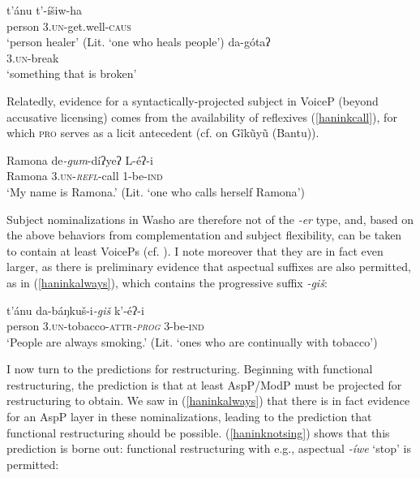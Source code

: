 \documentclass[output=paper]{langscibook}
\begin{document}
\ea \gll t'ánu t'-íšiw-ha\\
person 3.\textsc{un}-get.well-{\scshape caus}\\
\glt `person healer' (Lit. `one who heals people') \label{haninkhealer}
\ex \gll da-gótaʔ\\
\textsc{3.{\scshape un}}-{break}\\
\glt `something that is broken' \label{haninkbroken}
\z 

\noindent Relatedly, evidence for a syntactically-projected subject in VoiceP (beyond accusative licensing) comes from the availability of reflexives (\ref{haninkcall}), for which {\scshape pro} serves as a licit antecedent (cf. \citealt{bakervinokurova2009} on Gĩkũyũ (Bantu)). 

\ea \gll Ramona de{\itshape -gum}-díʔyeʔ L-éʔ-i\\
Ramona {\scshape 3.{\scshape un}}-\textit{\textsc{refl}}-call 1-be-{\scshape ind}\\
\glt `My name is Ramona.' (Lit. `{one who calls herself Ramona}') \label{haninkcall}
\z

Subject nominalizations in Washo are therefore not of the {\itshape -er} type, and, based on the above behaviors from complementation and subject flexibility, can be taken to contain at least VoicePs (cf.  \citealt{bochnaketal2011}). I note moreover that they are in fact even larger, as there is preliminary evidence that aspectual suffixes are also permitted, as in (\ref{haninkalways}), which contains the progressive suffix {\itshape -giš}:%

 \ea \gll t'ánu da-báŋkuš-i{\itshape-giš} k'-é{ʔ}-i\\
person {\scshape 3.un}-tobacco-{\scshape attr}\textit{\textsc{-prog}} 3-be-{\scshape ind}\\
\glt `People are always smoking.' (Lit. `{ones who are continually with tobacco}')\label{haninkalways}
\z



I now turn to the predictions for restructuring. Beginning with functional restructuring, the prediction is that at least AspP/ModP must be projected for restructuring to obtain. We saw in (\ref{haninkalways}) that there is in fact evidence for an AspP layer in these nominalizations, leading to the prediction that functional restructuring should be possible. (\ref{haninknotsing}) shows that this prediction is borne out: functional restructuring with e.g., aspectual {\itshape -íwe} `stop' is permitted:
\end{document}
